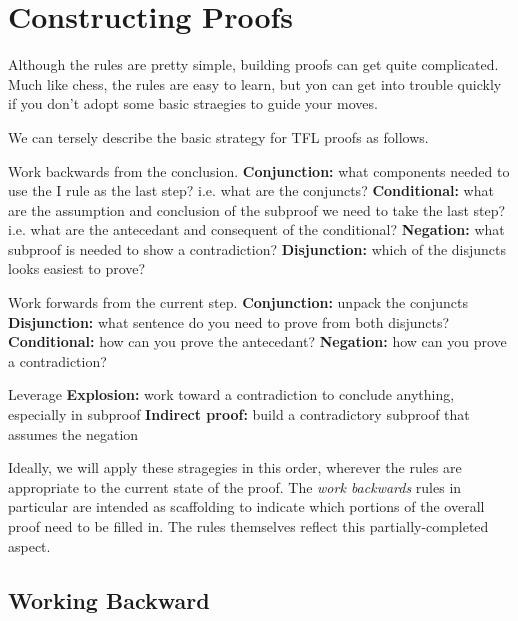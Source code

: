 \section{Constructing Proofs}

Although the rules are pretty simple, building proofs can get quite complicated.
Much like chess, the rules are easy to learn, but yon can get into trouble
quickly if you don't adopt some basic straegies to guide your moves.

\begin{observation}
  \label{obs:tfl-proof-strategies}
  We can tersely describe the basic strategy for TFL proofs as follows.
  \begin{outline}[enumerate]

    \1 Work backwards from the conclusion.
    \2 \textbf{Conjunction:} what components needed to use the \eand I rule as
    the last step? i.e. what are the conjuncts?
    \2 \textbf{Conditional:} what are the assumption and conclusion of the
    subproof we need to take the last step? i.e. what are the antecedant and
    consequent of the conditional?
    \2 \textbf{Negation:} what subproof is needed to show a contradiction?
    \2 \textbf{Disjunction:} which of the disjuncts looks easiest to prove?
    
    \1 Work forwards from the current step.
    \2 \textbf{Conjunction:} unpack the conjuncts
    \2 \textbf{Disjunction:} what sentence do you need to prove from both
    disjuncts?
    \2 \textbf{Conditional:} how can you prove the antecedant?
    \2 \textbf{Negation:} how can you prove a contradiction?
    
    \1 Leverage \ebot
    \2 \textbf{Explosion:} work toward a contradiction to conclude anything,
    especially in subproof
    \2 \textbf{Indirect proof:} build a contradictory subproof that assumes the negation

  \end{outline}
\end{observation}

Ideally, we will apply these stragegies in this order, wherever the rules are
appropriate to the current state of the proof. The \emph{work backwards} rules
in particular are intended as scaffolding to indicate which portions of the
overall proof need to be filled in. The rules themselves reflect this
partially-completed aspect.

\subsection{Working Backward}

